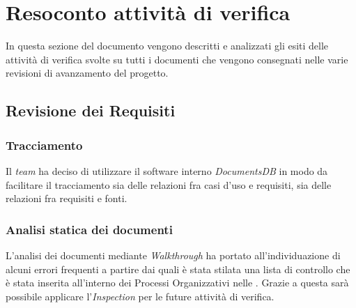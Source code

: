 \newpage
\section{Resoconto attività di verifica}
In questa sezione del documento vengono descritti e analizzati gli esiti delle attività di verifica svolte su tutti i documenti che vengono consegnati nelle varie revisioni di avanzamento del progetto.

\subsection{Revisione dei Requisiti}

\subsubsection{Tracciamento}
Il \textit{team} ha deciso di utilizzare il software interno \textit{DocumentsDB} in modo da facilitare il tracciamento sia delle relazioni fra casi d'uso e requisiti, sia delle relazioni fra requisiti e fonti.

\subsubsection{Analisi statica dei documenti}
L'analisi dei documenti mediante \textit{Walkthrough} ha portato all'individuazione di alcuni errori frequenti a partire dai quali è stata stilata una lista di controllo che è stata inserita all'interno dei Processi Organizzativi nelle \textit{\NdP}. Grazie a questa sarà possibile applicare l'\textit{Inspection} per le future attività di verifica.


